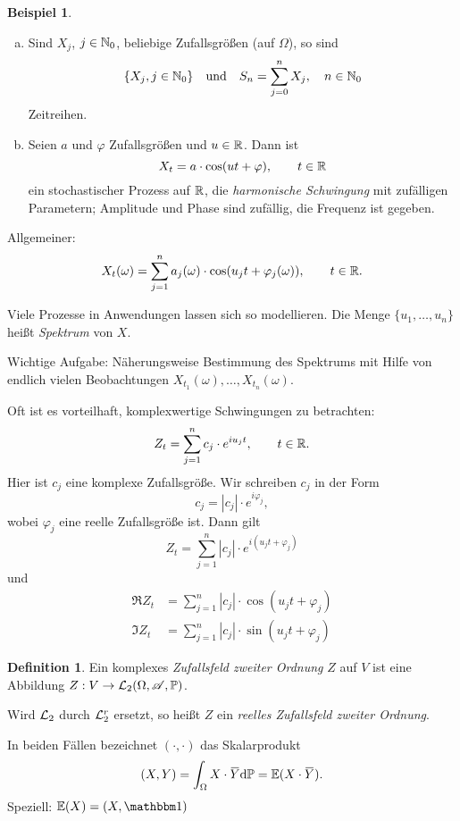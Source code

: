 \documentclass[
 a4paper,
 12pt,
 parskip=half
 ]{scrreprt}
\theoremstyle{plain}
\theoremstyle{definition}
\newtheorem{defn}[thm]{Definition}
\newtheorem{exmp}[thm]{Beispiel}
\numberwithin{equation}{section}
\begin{document}
\begin{exmp}
  \begin{enumerate}[(a)]
  \item Sind $X_j$, $j \in \mathbb{N}_0$, beliebige Zufallsgrößen (auf $\Omega$), so
    sind
    \[ \{X_j, j \in \mathbb{N}_0\} \quad \text{und} \quad S_n = \sum_{j=0}^n X_j,
      \quad n \in \mathbb{N}_0 \]
    Zeitreihen.
  \item Seien $a$ und $\varphi$ Zufallsgrößen und $u \in \mathbb{R}$. Dann ist
    \[ X_t = a \cdot \cos (ut + \varphi), \qquad t \in \mathbb{R} \]
    ein stochastischer Prozess auf $\mathbb{R}$, die \emph{harmonische Schwingung}
    mit zufälligen Parametern; Amplitude und Phase sind zufällig, die Frequenz
    ist gegeben.
  \end{enumerate}

  Allgemeiner:
  \[ X_t(\omega) = \sum_{j=1}^n a_j(\omega) \cdot
    \cos(u_j t + \varphi_j(\omega)), \qquad t \in \mathbb{R}. \]
  
  Viele Prozesse in Anwendungen lassen sich so modellieren. Die Menge $\{ u_1,
  \ldots, u_n \}$ heißt \emph{Spektrum} von $X$.

  Wichtige Aufgabe: Näherungsweise Bestimmung des Spektrums mit Hilfe von
  endlich vielen Beobachtungen $X_{t_1}(\omega), \ldots, X_{t_n}(\omega)$.

  Oft ist es vorteilhaft, komplexwertige Schwingungen zu betrachten:
  \[ Z_t = \sum_{j=1}^n c_j \cdot e^{i u_j t}, \qquad t \in \mathbb{R}. \]
  Hier ist $c_j$ eine komplexe Zufallsgröße. Wir schreiben $c_j$ in der Form
  \[ c_j = | c_j | \cdot e^{i \varphi_j}, \]
  wobei $\varphi_j$ eine reelle Zufallsgröße ist. Dann gilt
  \[ Z_t = \sum_{j=1}^n |c_j| \cdot e^{i(u_j t + \varphi_j)} \]
  und 
  \begin{align*}
    \Re Z_t &= \sum_{j=1}^n |c_j| \cdot \cos (u_j t + \varphi_j) \\
    \Im Z_t &= \sum_{j=1}^n |c_j| \cdot \sin (u_j t + \varphi_j)
  \end{align*}
\end{exmp}

\begin{defn}
  Ein komplexes \emph{Zufallsfeld zweiter Ordnung} $Z$ auf $V$ ist eine
  Abbildung $Z: V \to \mathcal{L}_2(\Omega,\mathscr{A},\mathbb{P})$.

  Wird $\mathcal{L}_2$ durch $\mathcal{L}_2^r$ ersetzt, so heißt $Z$ ein \emph{reelles
    Zufallsfeld zweiter Ordnung}.
\end{defn}

In beiden Fällen bezeichnet $(\cdot, \cdot)$ das Skalarprodukt
\[ (X,Y) = \int_{\Omega} X \cdot \obar{Y} \diffop \pP = \pE(X \cdot \obar{Y}). \]
Speziell: $\pE(X) = (X,\ind)$
\end{document}
